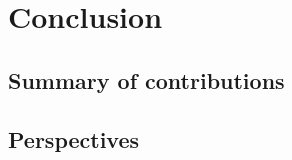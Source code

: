 \chapter{Conclusion}
\label{chap:conclusion}

\section{Summary of contributions}
\section{Perspectives}